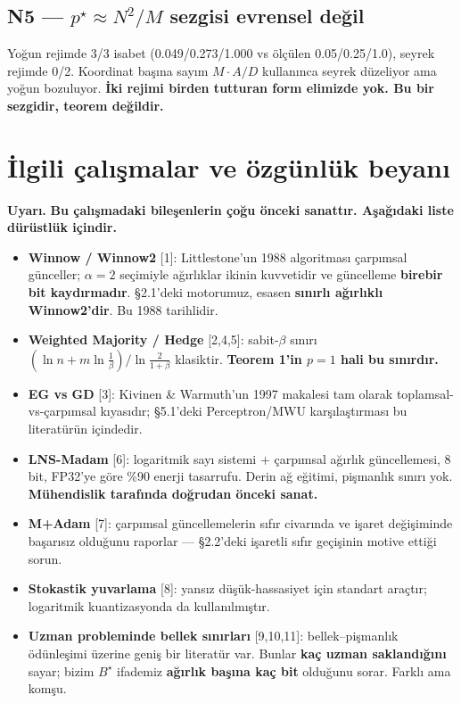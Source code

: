 \documentclass[11pt]{article}
\newenvironment{notkutu}{\def\FrameCommand{\fboxsep=6pt\colorbox{kutu}}\MakeFramed{\advance\hsize-\width\FrameRestore}\small}{\endMakeFramed}
\begin{document}
\subsection*{N5 — $p^\star \approx N^2/M$ sezgisi evrensel değil}
Yoğun rejimde 3/3 isabet (0.049/0.273/1.000 vs ölçülen 0.05/0.25/1.0), seyrek rejimde 0/2. Koordinat başına sayım $M\cdot A/D$ kullanınca seyrek düzeliyor ama yoğun bozuluyor. \textbf{İki rejimi birden tutturan form elimizde yok. Bu bir sezgidir, teorem değildir.}
\section*{İlgili çalışmalar ve özgünlük beyanı}
\begin{notkutu}\textbf{Uyarı.} \textbf{Bu çalışmadaki bileşenlerin çoğu önceki sanattır. Aşağıdaki liste dürüstlük içindir.}
\end{notkutu}
\begin{itemize}\item \textbf{Winnow / Winnow2} [1]: Littlestone'un 1988 algoritması çarpımsal günceller; $\alpha{=}2$ seçimiyle ağırlıklar ikinin kuvvetidir ve güncelleme \textbf{birebir bit kaydırmadır}. §2.1'deki motorumuz, esasen \textbf{sınırlı ağırlıklı Winnow2'dir}. Bu 1988 tarihlidir.
\item \textbf{Weighted Majority / Hedge} [2,4,5]: sabit-$\beta$ sınırı $(\ln n + m\ln\tfrac1\beta)/\ln\tfrac{2}{1+\beta}$ klasiktir. \textbf{Teorem 1'in $p{=}1$ hali bu sınırdır.}
\item \textbf{EG vs GD} [3]: Kivinen \& Warmuth'un 1997 makalesi tam olarak toplamsal-vs-çarpımsal kıyasıdır; §5.1'deki Perceptron/MWU karşılaştırması bu literatürün içindedir.
\item \textbf{LNS-Madam} [6]: logaritmik sayı sistemi + çarpımsal ağırlık güncellemesi, 8 bit, FP32'ye göre \%90 enerji tasarrufu. Derin ağ eğitimi, pişmanlık sınırı yok. \textbf{Mühendislik tarafında doğrudan önceki sanat.}
\item \textbf{M+Adam} [7]: çarpımsal güncellemelerin sıfır civarında ve işaret değişiminde başarısız olduğunu raporlar — §2.2'deki işaretli sıfır geçişinin motive ettiği sorun.
\item \textbf{Stokastik yuvarlama} [8]: yansız düşük-hassasiyet için standart araçtır; logaritmik kuantizasyonda da kullanılmıştır.
\item \textbf{Uzman probleminde bellek sınırları} [9,10,11]: bellek–pişmanlık ödünleşimi üzerine geniş bir literatür var. Bunlar \textbf{kaç uzman saklandığını} sayar; bizim $B^\star$ ifademiz \textbf{ağırlık başına kaç bit} olduğunu sorar. Farklı ama komşu.
\end{itemize}
\end{document}
